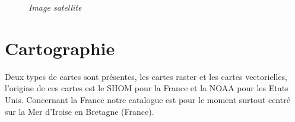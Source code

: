 \begin{center}
\begin{figure}[ht]
\caption{\label{equiProj}\textit{Image satellite }}
\end{figure}
\end{center}

\chapter{Cartographie}
Deux types de cartes sont présentes, les cartes raster et les cartes vectorielles, l'origine de ces cartes est le SHOM pour la France et la NOAA pour les Etats Unis. Concernant la France notre catalogue est pour le moment surtout centré sur la Mer d'Iroise en Bretagne (France).
